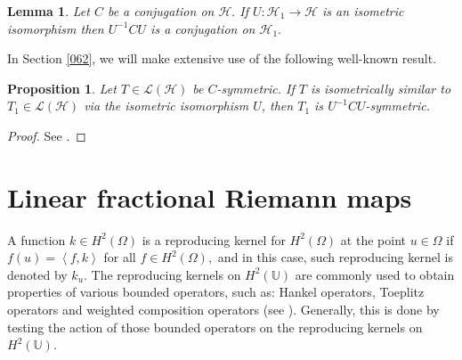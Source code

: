 \documentclass[11pt]{amsart}%
\newtheorem{lem}[thm]{Lemma}
\newtheorem{pps}[thm]{Proposition}
\theoremstyle{definition}
\theoremstyle{remark}
\numberwithin{equation}{section}
\begin{document}
\begin{lem}
\label{065} Let $C$ be a conjugation on $\mathcal{H}.$ If $U:\mathcal{H}%
_{1}\longrightarrow\mathcal{H}$ is an isometric isomorphism then $U^{-1}CU$ is
a conjugation on $\mathcal{H}_{1}.$
\end{lem}

In Section \ref{062}, we will make extensive use of the following well-known result.



\begin{pps}
Let $T\in\mathcal{L}(\mathcal{H})$ be $C$-symmetric. If $T$ is
isometrically similar to $T_1\in\mathcal{L}(\mathcal{H})$ via the
isometric isomorphism $U$, then $T_1$ is $U^{-1}CU$-symmetric.
\end{pps}

\begin{proof}
See \cite[p. 1291]{Garc2}.

\end{proof}

\section{Linear fractional Riemann maps}

\label{090}

A function $k\in H^{2}(\Omega)$ is a reproducing kernel for $H^{2}(\Omega)$ at
the point $u\in\Omega$ if $f(u)=\left\langle f,k\right\rangle $ for all $f\in
H^{2}(\Omega),$ and in this case, such reproducing kernel is denoted by
$k_{u}.$ The reproducing kernels on $H^{2}(\mathbb{U})$ are commonly used to
obtain properties of various bounded operators, such as: Hankel operators, Toeplitz operators
and weighted composition operators (see \cite{Cowen-Ko,Eva-Kumar, Garc1}). Generally,
this is done by testing the action of those bounded operators on the
reproducing kernels on $H^{2}(\mathbb{U}).$

\end{document}
